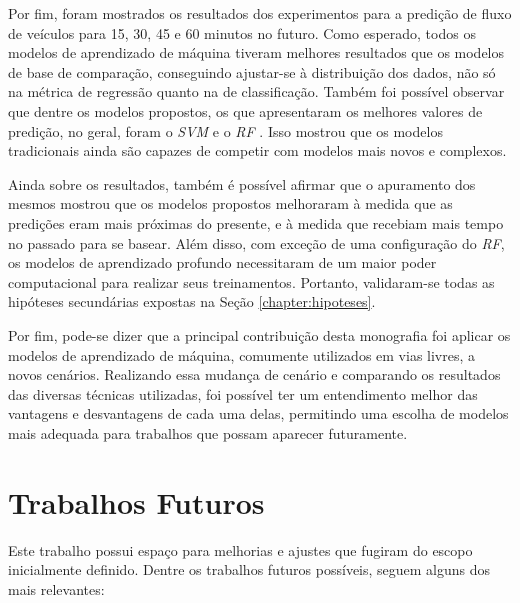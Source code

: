 Por fim, foram mostrados os resultados dos experimentos para a predição de fluxo de veículos para 15, 30, 45 e 60 minutos no futuro. Como esperado, todos os modelos de aprendizado de máquina tiveram melhores resultados que os modelos de base de comparação, conseguindo ajustar-se à distribuição dos dados, não só na métrica de regressão quanto na de classificação. Também foi possível observar que dentre os modelos propostos, os que apresentaram os melhores valores de predição, no geral, foram o \textit{\acrshort{SVM}} e o \textit{\acrshort{RF}} . Isso mostrou que os modelos tradicionais ainda são capazes de competir com modelos mais novos e complexos. 

Ainda sobre os resultados, também é possível afirmar que o apuramento dos mesmos mostrou que os modelos propostos melhoraram à medida que as predições eram mais próximas do presente, e à medida que recebiam mais tempo no passado para se basear. Além disso, com exceção de uma configuração do \textit{\acrshort{RF}}, os modelos de aprendizado profundo necessitaram de um maior poder computacional para realizar seus treinamentos. Portanto, validaram-se todas as hipóteses secundárias expostas na Seção \ref{chapter:hipoteses}.

Por fim, pode-se dizer que a principal contribuição desta monografia foi aplicar os modelos de aprendizado de máquina, comumente utilizados em vias livres, a novos cenários. Realizando essa mudança de cenário e comparando os resultados das diversas técnicas utilizadas, foi possível ter um entendimento melhor das vantagens e desvantagens de cada uma delas, permitindo uma escolha de modelos mais adequada para trabalhos que possam aparecer futuramente.

\section{Trabalhos Futuros}

Este trabalho possui espaço para melhorias e ajustes que fugiram do escopo inicialmente definido. Dentre os trabalhos futuros possíveis, seguem alguns dos mais relevantes:

